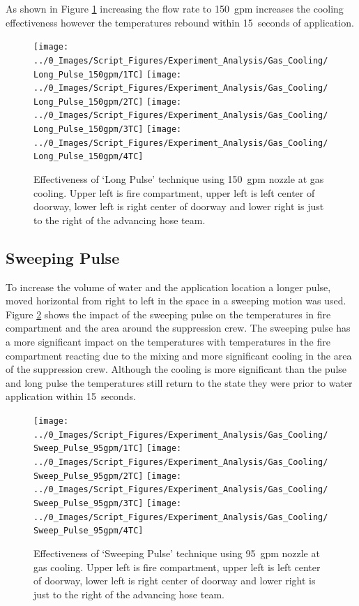 \documentclass[12pt,oneside]{book}
\begin{document}
As shown in Figure \ref{fig:gas_long_pulse_150} increasing the flow rate to 150~gpm increases the cooling effectiveness however the temperatures rebound within 15~seconds of application. 

\begin{figure}[H]
\centering
\texttt{[image: ../0\_Images/Script\_Figures/Experiment\_Analysis/Gas\_Cooling/Long\_Pulse\_150gpm/1TC]}
\texttt{[image: ../0\_Images/Script\_Figures/Experiment\_Analysis/Gas\_Cooling/Long\_Pulse\_150gpm/2TC]}
\texttt{[image: ../0\_Images/Script\_Figures/Experiment\_Analysis/Gas\_Cooling/Long\_Pulse\_150gpm/3TC]}
\texttt{[image: ../0\_Images/Script\_Figures/Experiment\_Analysis/Gas\_Cooling/Long\_Pulse\_150gpm/4TC]}
\caption[Gas Cooling - Long Pulse 150~gpm]{Effectiveness of `Long Pulse' technique using 150~gpm nozzle at gas cooling. Upper left is fire compartment, upper left is left center of doorway, lower left is right center of doorway and lower right is just to the right of the advancing hose team.}
\label{fig:gas_long_pulse_150}
\end{figure}

\subsection {Sweeping Pulse}
To increase the volume of water and the application location a longer pulse, moved horizontal from right to left in the space in a sweeping motion was used. Figure \ref{fig:gas_sweep_pulse_95} shows the impact of the sweeping pulse on the temperatures in fire compartment and the area around the suppression crew. The sweeping pulse has a more significant impact on the temperatures with temperatures in the fire compartment reacting due to the mixing and more significant cooling in the area of the suppression crew. Although the cooling is more significant than the pulse and long pulse the temperatures still return to the state they were prior to water application within 15~seconds.

\begin{figure}[H]
\centering
\texttt{[image: ../0\_Images/Script\_Figures/Experiment\_Analysis/Gas\_Cooling/Sweep\_Pulse\_95gpm/1TC]}
\texttt{[image: ../0\_Images/Script\_Figures/Experiment\_Analysis/Gas\_Cooling/Sweep\_Pulse\_95gpm/2TC]}
\texttt{[image: ../0\_Images/Script\_Figures/Experiment\_Analysis/Gas\_Cooling/Sweep\_Pulse\_95gpm/3TC]}
\texttt{[image: ../0\_Images/Script\_Figures/Experiment\_Analysis/Gas\_Cooling/Sweep\_Pulse\_95gpm/4TC]}
\caption[Gas Cooling - Sweeping Pulse 95~gpm]{Effectiveness of `Sweeping Pulse' technique using 95~gpm nozzle at gas cooling. Upper left is fire compartment, upper left is left center of doorway, lower left is right center of doorway and lower right is just to the right of the advancing hose team.}
\label{fig:gas_sweep_pulse_95}
\end{figure}
\end{document}
